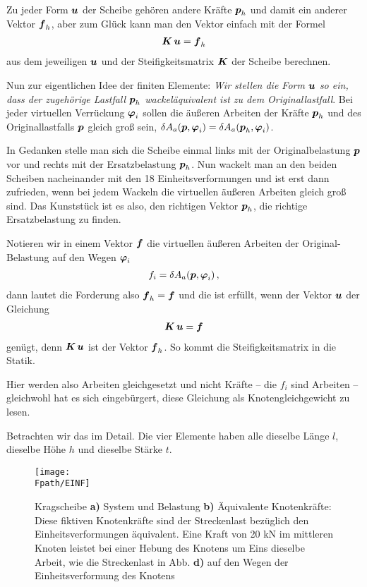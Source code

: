Zu jeder Form $\mbox{\boldmath $u$} $ der Scheibe geh\"{o}ren andere Kr\"{a}fte $\mbox{\boldmath $p$}_h$ und damit ein anderer Vektor $\mbox{\boldmath $f$}_h $, aber zum Gl\"{u}ck kann man den Vektor einfach mit der Formel
\begin{align}
\mbox{\boldmath $K$}\,\mbox{\boldmath $u$} = \mbox{\boldmath $f$}_h
\end{align}
aus dem jeweiligen $\mbox{\boldmath $u$} $ und der  Steifigkeitsmatrix $\mbox{\boldmath $K$} $ der Scheibe berechnen.

Nun zur eigentlichen Idee der finiten Elemente:  {\em Wir stellen die Form $\mbox{\boldmath $u$} $ so ein, dass der zugeh\"{o}rige Lastfall $\mbox{\boldmath $p$}_h $ \glq wackel\"{a}quivalent\grq{} ist zu dem Originallastfall\/}.  Bei jeder virtuellen Verr\"{u}ckung $\mbox{\boldmath $\varphi$}_i$ sollen die \"{a}u{\ss}eren Arbeiten der Kr\"{a}fte $\mbox{\boldmath $p$}_h$ und des Originallastfalls $\mbox{\boldmath $p$}$ gleich gro{\ss} sein, $\delta A_a(\mbox{\boldmath $p$},\mbox{\boldmath $\varphi$}_i) = \delta A_a(\mbox{\boldmath $p$}_h,\mbox{\boldmath $\varphi$}_i)$.

In Gedanken stelle man sich die Scheibe einmal links mit der Originalbelastung $\mbox{\boldmath $p$}$ vor und rechts mit der Ersatzbelastung $\mbox{\boldmath $p$}_h $. Nun wackelt man an den beiden Scheiben nacheinander mit den 18 Einheitsverformungen und ist erst dann zufrieden, wenn bei jedem Wackeln die virtuellen \"{a}u{\ss}eren Arbeiten gleich gro{\ss} sind. Das Kunstst\"{u}ck ist es also, den richtigen Vektor $\mbox{\boldmath $p$}_h $, die richtige Ersatzbelastung zu finden.

Notieren wir in einem Vektor $\mbox{\boldmath $f$} $ die virtuellen \"{a}u{\ss}eren Arbeiten der Original-Belastung auf den Wegen $\mbox{\boldmath $\varphi$}_i$
\begin{align}
f_i = \delta A_a(\mbox{\boldmath $p$},\mbox{\boldmath $\varphi$}_i)\,,
\end{align}
dann lautet die Forderung also $\mbox{\boldmath $f$}_h = \mbox{\boldmath $f$}$ und die ist erf\"{u}llt, wenn der Vektor $\mbox{\boldmath $u$} $ der Gleichung
\begin{align}
\mbox{\boldmath $K$}\,\mbox{\boldmath $u$} = \mbox{\boldmath $f$}
\end{align}
gen\"{u}gt, denn $\mbox{\boldmath $K$}\,\mbox{\boldmath $u$} $ ist der Vektor $\mbox{\boldmath $f$}_h$. So kommt die Steifigkeitsmatrix in die Statik.

Hier werden also Arbeiten gleichgesetzt und nicht Kr\"{a}fte -- die $f_i$ sind Arbeiten -- gleichwohl hat es sich eingeb\"{u}rgert, diese Gleichung als \glq Knotengleichgewicht\grq{} zu lesen.

Betrachten wir das im Detail. Die vier Elemente haben alle dieselbe L\"{a}nge $l$, dieselbe H\"{o}he $h$ und dieselbe St\"{a}rke $t$.
\begin{figure}[tbp] \centering
\if {} \sidecaption \fi
\texttt{[image: \\Fpath/EINF]}
\caption{Kragscheibe {\bf a)} System und Belastung {\bf b)} \"{A}quivalente Knotenkr\"{a}fte:
Diese fiktiven Knotenkr\"{a}fte sind der Streckenlast bez\"{u}glich den Einheitsverformungen \"{a}quivalent. Eine Kraft von 20 kN im mittleren Knoten leistet bei einer
Hebung des Knotens um Eins dieselbe Arbeit, wie die Streckenlast in Abb. {\bf d)} auf
den Wegen der Einheitsverformung des Knotens} \label{Einf}
\end{figure}%

